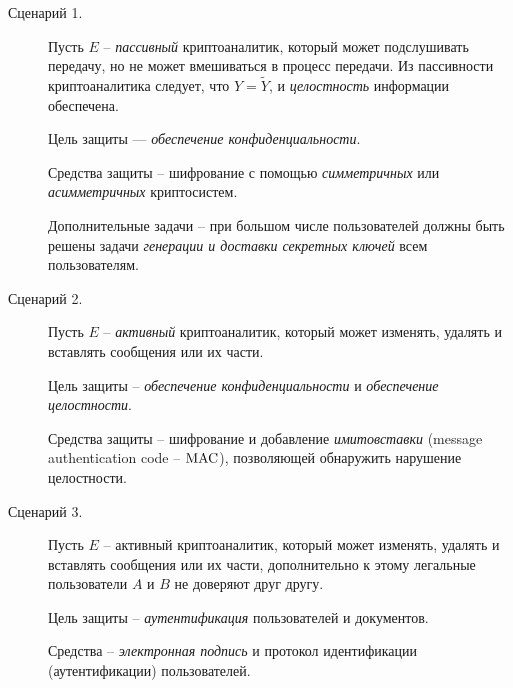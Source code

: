 \begin{description}
    \item[Сценарий 1.] Пусть $E$ -- \emph{пассивный} криптоаналитик, который может подслушивать передачу, но не может вмешиваться в процесс передачи. Из пассивности криптоаналитика следует, что $Y = \widetilde{Y}$, и \emph{целостность} информации обеспечена.

Цель защиты --- \emph{обеспечение конфиденциальности}.

Средства защиты -- шифрование с помощью \emph{симметричных} или \emph{асимметричных } криптосистем.

Дополнительные задачи -- при большом числе пользователей должны быть решены задачи \emph{генерации и доставки секретных ключей} всем пользователям.

    \item[Сценарий 2.] Пусть $E$ -- \emph{активный} криптоаналитик, который может изменять, удалять и вставлять сообщения или их части.

    Цель защиты -- \emph{обеспечение конфиденциальности} и \emph{обеспечение целостности}.

Средства защиты -- шифрование и добавление \emph{имитовставки} (message authentication code -- $\textrm{MAC}$), позволяющей обнаружить нарушение целостности.

    \item[Сценарий 3.] Пусть $E$ -- активный криптоаналитик, который может изменять, удалять и вставлять сообщения или их части, дополнительно к этому легальные пользователи $A$ и $B$ не доверяют друг другу.

Цель защиты -- \emph{аутентификация} пользователей и документов.

Средства -- \emph{электронная подпись} и протокол идентификации (аутентификации) пользователей.
\end{description}

%
